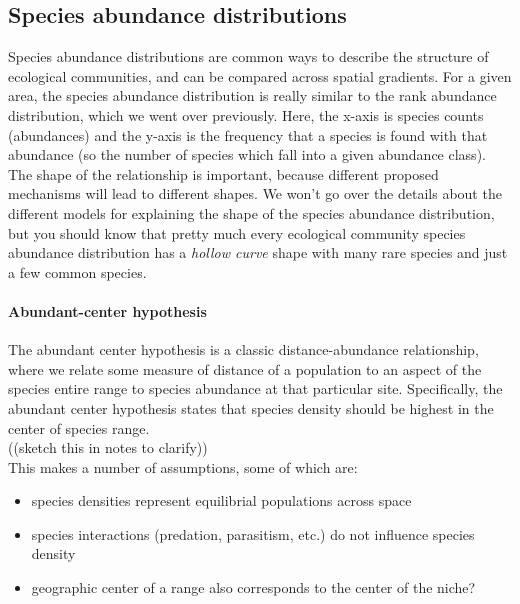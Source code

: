 \documentclass[12pt]{article}
\begin{document}
\bigskip



\subsection*{Species abundance distributions}

Species abundance distributions are common ways to describe the structure of ecological communities, and can be compared across spatial gradients. For a given area, the species abundance distribution is really similar to the rank abundance distribution, which we went over previously. Here, the x-axis is species counts (abundances) and the y-axis is the frequency that a species is found with that abundance (so the number of species which fall into a given abundance class). The shape of the relationship is important, because different proposed mechanisms will lead to different shapes. We won't go over the details about the different models for explaining the shape of the species abundance distribution, but you should know that pretty much every ecological community species abundance distribution has a \textit{hollow curve} shape with many rare species and just a few common species. 







\bigskip




\paragraph*{Abundant-center hypothesis}

The abundant center hypothesis is a classic distance-abundance relationship, where we relate some measure of distance of a population to an aspect of the species entire range to species abundance at that particular site. Specifically, the abundant center hypothesis states that species density should be highest in the center of species range. \\



((sketch this in notes to clarify)) \\


This makes a number of assumptions, some of which are:

\begin{itemize}
  \item species densities represent equilibrial populations across space
  \item species interactions (predation, parasitism, etc.) do not influence species density
  \item geographic center of a range also corresponds to the center of the niche?
\end{itemize}
\end{document}
